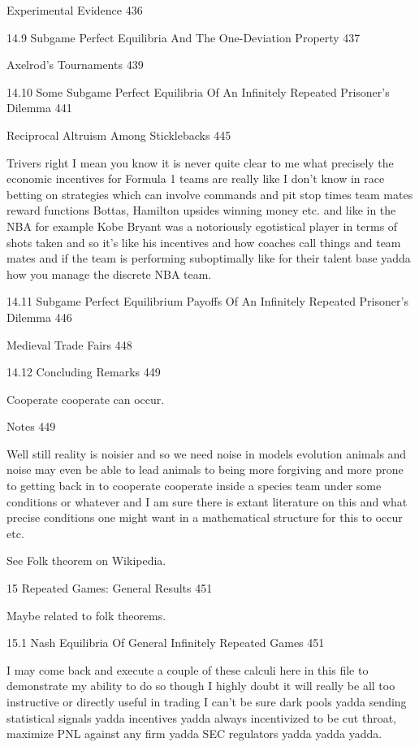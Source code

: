 Experimental Evidence 436



14.9 Subgame Perfect Equilibria And The One-Deviation Property 437



Axelrod's Tournaments 439



14.10 Some Subgame Perfect Equilibria Of An Infinitely Repeated Prisoner's Dilemma 441



Reciprocal Altruism Among Sticklebacks 445

Trivers right I mean you know it is never quite clear to me what precisely the economic incentives for Formula 1 teams are really like I don't know in race betting on strategies which can involve commands and pit stop times team mates reward functions Bottas, Hamilton upsides winning money etc. and like in the NBA for example Kobe Bryant was a notoriously egotistical player in terms of shots taken and so it's like his incentives and how coaches call things and team mates and if the team is performing suboptimally like for their talent base yadda how you manage the discrete NBA team.

14.11 Subgame Perfect Equilibrium Payoffs Of An Infinitely Repeated Prisoner's Dilemma 446



Medieval Trade Fairs 448



14.12 Concluding Remarks 449

Cooperate cooperate can occur.

Notes 449

Well still reality is noisier and so we need noise in models evolution animals and noise may even be able to lead animals to being more forgiving and more prone to getting back in to cooperate cooperate inside a species team under some conditions or whatever and I am sure there is extant literature on this and what precise conditions one might want in a mathematical structure for this to occur etc.

See Folk theorem on Wikipedia.

15 Repeated Games: General Results 451

Maybe related to folk theorems.

15.1 Nash Equilibria Of General Infinitely Repeated Games 451

I may come back and execute a couple of these calculi here in this file to demonstrate my ability to do so though I highly doubt it will really be all too instructive or directly useful in trading I can't be sure dark pools yadda sending statistical signals yadda incentives yadda always incentivized to be cut throat, maximize PNL against any firm yadda SEC regulators yadda yadda yadda.

